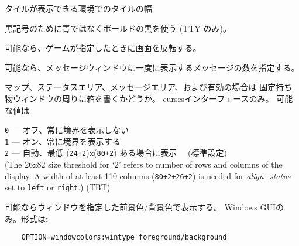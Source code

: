 タイルが表示できる環境でのタイルの幅
\item[\ib{use\verb+_+darkgray}]
黒記号のために青ではなくボールドの黒を使う (TTY のみ)。
\item[\ib{use\verb+_+inverse}]
可能なら、ゲームが指定したときに画面を反転する。
\item[\ib{vary\verb+_+msgcount}]
可能なら、メッセージウィンドウに一度に表示するメッセージの数を指定する。
\item[\ib{windowborders}]
マップ、ステータスエリア、メッセージエリア、および有効の場合は
固定持ち物ウィンドウの周りに箱を書くかどうか。
cursesインターフェースのみ。
可能な値は

{\tt 0} --- オフ、常に境界を表示しない\\
{\tt 1} --- オン、常に境界を表示する\\
{\tt 2} --- 自動、最低
(\verb&24+2&)x(\verb&80+2&) ある場合に表示 \ \ (標準設定)\\

(The 26x82 size threshold for `2' refers to number of rows and
columns of the display.
A width of at least 110 columns (\verb&80+2+26+2&) is needed for
{\it align_status\/}
set to {\tt left} or {\tt right}.)
(TBT)
\item[\ib{windowcolors}]
可能ならウィンドウを指定した前景色/背景色で表示する。
Windows GUIのみ。形式は:
\begin{verbatim}
    OPTION=windowcolors:wintype foreground/background
\end{verbatim}

